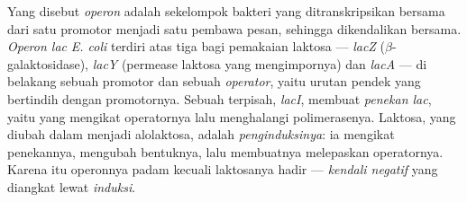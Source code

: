 \begin{definition}\label{def:b1:expression-control:operon}
Yang disebut \emph{operon} adalah sekelompok  bakteri yang
ditranskripsikan bersama dari satu promotor menjadi satu pembawa pesan,
sehingga dikendalikan bersama. \emph{Operon lac} \emph{E. coli}
terdiri atas tiga  bagi pemakaian laktosa --- \emph{lacZ}
($\beta$-galaktosidase), \emph{lacY} (permease laktosa yang
mengimpornya) dan \emph{lacA} --- di belakang sebuah promotor dan
sebuah \emph{operator}, yaitu urutan pendek yang bertindih dengan
promotornya. Sebuah  terpisah, \emph{lacI}, membuat \emph{penekan
lac}, yaitu  yang mengikat operatornya lalu menghalangi
polimerasenya. Laktosa, yang diubah dalam  menjadi alolaktosa,
adalah \emph{penginduksinya}: ia mengikat penekannya, mengubah
bentuknya, lalu membuatnya melepaskan operatornya. Karena itu operonnya
padam kecuali laktosanya hadir --- \emph{kendali negatif} yang diangkat
lewat \emph{induksi}.
\end{definition}


